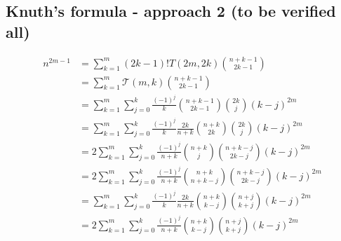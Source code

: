 \subsection{Knuth's formula - approach 2 (to be verified all)}\label{subsec:knuth's-formula---approach-2-(to-be-verified-all)}
\begin{align*}
    n^{2m-1}
    &= \sum_{k=1}^{m} (2k-1)! T(2m,2k) \binom{n+k-1}{2k-1}  \\
    &= \sum_{k=1}^{m} \mathcal{T}(m,k) \binom{n+k-1}{2k-1} \\
    &= \sum_{k=1}^{m} \sum_{j=0}^{k} \frac{(-1)^j}{k} \binom{n+k-1}{2k-1} \binom{2k}{j} (k-j)^{2m}  \\
    &= \sum_{k=1}^{m} \sum_{j=0}^{k} \frac{(-1)^{j}}{k} \frac{2k}{n+k} \binom{n+k}{2k} \binom{2k}{j} (k-j)^{2m}  \\
    &= 2\sum_{k=1}^{m} \sum_{j=0}^{k} \frac{(-1)^{j}}{n+k} \binom{n+k}{j} \binom{n+k-j}{2k-j} (k-j)^{2m}  \\
    &= 2\sum_{k=1}^{m} \sum_{j=0}^{k} \frac{(-1)^{j}}{n+k} \binom{n+k}{n+k-j} \binom{n+k-j}{2k-j} (k-j)^{2m}  \\
    &= \sum_{k=1}^{m} \sum_{j=0}^{k} \frac{(-1)^{j}}{k} \frac{2k}{n+k} \binom{n+k}{k-j} \binom{n+j}{k+j} (k-j)^{2m}  \\
    &= 2\sum_{k=1}^{m} \sum_{j=0}^{k} \frac{(-1)^{j}}{n+k} \binom{n+k}{k-j} \binom{n+j}{k+j} (k-j)^{2m} \\
\end{align*}

